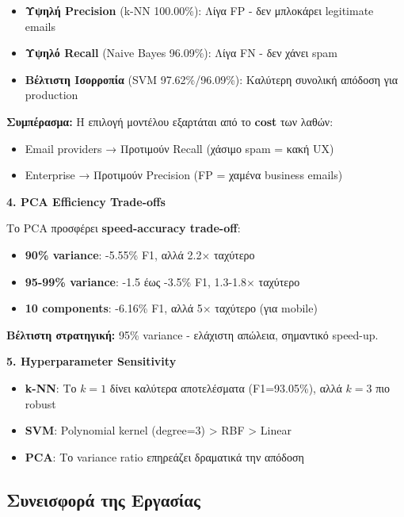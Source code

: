 \documentclass[12pt,a4paper,twoside]{book}
\begin{document}
\begin{itemize}
    \item \textbf{Υψηλή Precision} (k-NN 100.00\%): Λίγα FP - δεν μπλοκάρει legitimate emails
    \item \textbf{Υψηλό Recall} (Naive Bayes 96.09\%): Λίγα FN - δεν χάνει spam
    \item \textbf{Βέλτιστη Ισορροπία} (SVM 97.62\%/96.09\%): Καλύτερη συνολική απόδοση για production
\end{itemize}

\textbf{Συμπέρασμα:} Η επιλογή μοντέλου εξαρτάται από το \textbf{cost} των λαθών:
\begin{itemize}
    \item Email providers → Προτιμούν Recall (χάσιμο spam = κακή UX)
    \item Enterprise → Προτιμούν Precision (FP = χαμένα business emails)
\end{itemize}

\textbf{4. PCA Efficiency Trade-offs}

Το PCA προσφέρει \textbf{speed-accuracy trade-off}:

\begin{itemize}
    \item \textbf{90\% variance}: -5.55\% F1, αλλά 2.2× ταχύτερο
    \item \textbf{95-99\% variance}: -1.5 έως -3.5\% F1, 1.3-1.8× ταχύτερο
    \item \textbf{10 components}: -6.16\% F1, αλλά 5× ταχύτερο (για mobile)
\end{itemize}

\textbf{Βέλτιστη στρατηγική:} 95\% variance - ελάχιστη απώλεια, σημαντικό speed-up.

\textbf{5. Hyperparameter Sensitivity}

\begin{itemize}
    \item \textbf{k-NN}: Το \(k=1\) δίνει καλύτερα αποτελέσματα (F1=93.05\%), αλλά \(k=3\) πιο robust
    \item \textbf{SVM}: Polynomial kernel (degree=3) > RBF > Linear
    \item \textbf{PCA}: Το variance ratio επηρεάζει δραματικά την απόδοση
\end{itemize}

\subsection{Συνεισφορά της Εργασίας}
\end{document}
